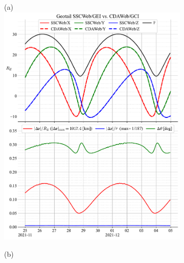 \documentclass[draft]{agujournal2019}
\begin{document}

\clearpage
\begin{figure}[h]
     \begin{subfigure}[b]{0.49\textwidth}
         (a)
         \centering
         \includegraphics[width=\textwidth]{code/figures/ephemeris/Geotail_SSCWeb-GEI_vs_CDAWeb-GCI.pdf}
     \end{subfigure}
     \begin{subfigure}[b]{0.49\textwidth}
         (b)
         \centering

\end{subfigure}
\end{figure}
\end{document}
